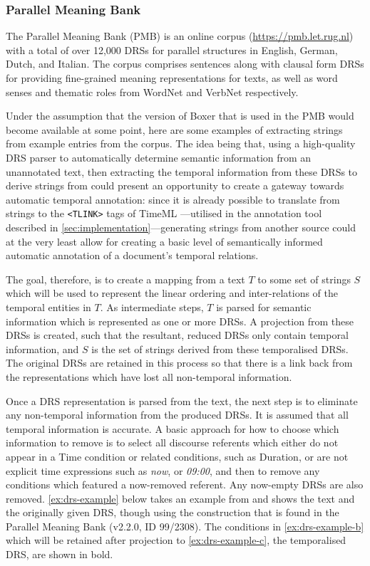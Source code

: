 \documentclass[a4paper,12pt,leqno]{article}
\begin{document}
\subsubsection{Parallel Meaning Bank}\label{ssub:pmb}
The Parallel Meaning Bank (PMB) is an online corpus (\url{https://pmb.let.rug.nl}) with a total of over 12,000 DRSs for parallel structures in English, German, Dutch, and Italian. The corpus comprises sentences along with clausal form DRSs for providing fine-grained meaning representations for texts, as well as word senses and thematic roles from WordNet \citep{fellbaum2010wordnet} and VerbNet \citep{schuler2005verbnet} respectively.

Under the assumption that the version of Boxer that is used in the PMB would become available at some point, here are some examples of extracting strings from example entries from the corpus. The idea being that, using a high-quality DRS parser to automatically determine semantic information from an unannotated text, then extracting the temporal information from these DRSs to derive strings from could present an opportunity to create a gateway towards automatic temporal annotation: since it is already possible to translate from strings to the \verb|<TLINK>| tags of TimeML \citep{timeml2005timeml}---utilised in the annotation tool described in \cref{sec:implementation}---generating strings from another source could at the very least allow for creating a basic level of semantically informed automatic annotation of a document's temporal relations.

The goal, therefore, is to create a mapping from a text $T$ to some set of strings $S$ which will be used to represent the linear ordering and inter-relations of the temporal entities in $T$. As intermediate steps, $T$ is parsed for semantic information which is represented as one or more DRSs. A projection from these DRSs is created, such that the resultant, reduced DRSs only contain temporal information, and $S$ is the set of strings derived from these temporalised DRSs. The original DRSs are retained in this process so that there is a link back from the representations which have lost all non-temporal information.

Once a DRS representation is parsed from the text, the next step is to eliminate any non-temporal information from the produced DRSs. It is assumed that all temporal information is accurate. A basic approach for how to choose which information to remove is to select all discourse referents which either do not appear in a Time condition or related conditions, such as Duration, or are not explicit time expressions such as \textit{now}, or \textit{09:00}, and then to remove any conditions which featured a now-removed referent. Any now-empty DRSs are also removed. \cref{ex:drs-example} below takes an example from \citet[p. 8]{abzianidze2019first} and shows the text and the originally given DRS, though using the construction that is found in the Parallel Meaning Bank (v2.2.0, ID 99/2308). The conditions in \ref{ex:drs-example-b} which will be retained after projection to \cref{ex:drs-example-c}, the temporalised DRS, are shown in bold.
\end{document}
